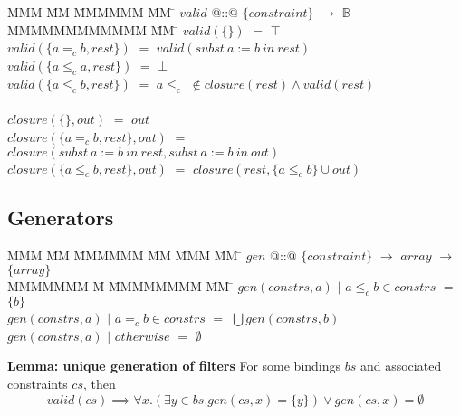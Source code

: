 \begin{tabbing}
MMM       \= MM \= MMMMMM \= MM \= \kill
$valid$   \> @::@  \> $\{constraint\}$  \> $\to$ \> $\mathbb{B}$ \\
MMMMMMMMMMMM                 \= MM  \= \kill
$valid(\{             \})$   \> $=$ \> $\top$  \\
$valid(\{a =_c b, rest\})$   \> $=$ \> $valid(subst~a:=b~in~rest)$  \\
$valid(\{a \le_c a, rest\})$ \> $=$ \> $\bot$                        \\
$valid(\{a \le_c b, rest\})$ \> $=$ \> $a \le_c \_ \not\in closure(rest) \wedge valid(rest)$                        \\
\\
$closure(\{\}, out)$                \> $=$ \> $out$ \\
$closure(\{a =_c b, rest\}, out)$   \> $=$ \> $closure(subst~a:=b~in~rest, subst~a:=b~in~out)$  \\
$closure(\{a \le_c b, rest\}, out)$ \> $=$ \> $closure(rest, \{a \le_c b\} \cup out)$ \\
\end{tabbing}



\subsection{Generators}

\begin{tabbing}
MMM       \= MM \= MMMMMM \= MM \= MMM \= MM \= \kill
$gen$   \> @::@  \> $\{constraint\}$  \> $\to$ \> $array$ \> $\to$ \> $\{array\}$ \\
MMMMMMM                 \= M  \= MMMMMMMM \= MM \= \kill
$gen(constrs, a)$ \> $|$ \> $a \le_c b \in constrs$ \> $=$ \> $\{b\}$                        \\
$gen(constrs, a)$ \> $|$ \> $a =_c b \in constrs$   \> $=$ \> $\bigcup gen(constrs, b)$                        \\
$gen(constrs, a)$ \> $|$ \> $otherwise$             \> $=$ \> $\emptyset$                        \\
\end{tabbing}

\textbf{Lemma: unique generation of filters}
For some bindings $bs$ and associated constraints $cs$, then
\[
valid(cs) \implies \forall x. (\exists y \in bs. gen(cs, x) = \{y\}) \vee gen(cs, x) = \emptyset
\]


